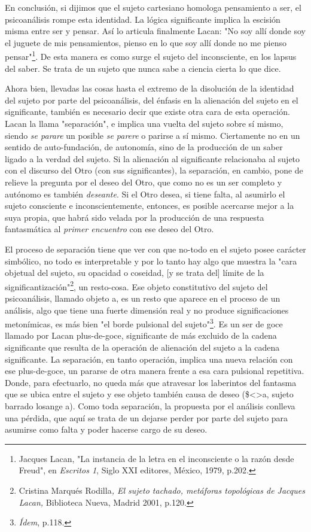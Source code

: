 \documentclass{book}
\begin{document}
En conclusión, si dijimos que el sujeto cartesiano homologa pensamiento
a ser, el psicoanálisis rompe esta identidad. La lógica significante
implica la escisión misma entre ser y pensar. Así lo articula finalmente
Lacan: "No soy allí donde soy el juguete de mis pensamientos, pienso en
lo que soy allí donde no me pienso pensar"\footnote{Jacques Lacan, "La
  instancia de la letra en el inconsciente o la razón desde Freud", en
  \emph{Escritos 1}, Siglo XXI editores, México, 1979, p.202.}. De esta
manera es como surge el sujeto del inconsciente, en los lapsus del
saber. Se trata de un sujeto que nunca sabe a ciencia cierta lo que
dice.

Ahora bien, llevadas las cosas hasta el extremo de la disolución de la
identidad del sujeto por parte del psicoanálisis, del énfasis en la
alienación del sujeto en el significante, también es necesario decir que
existe otra cara de esta operación. Lacan la llama "separación", e
implica una vuelta del sujeto sobre sí mismo, siendo \emph{se parare} un
posible \emph{se parere} o parirse a sí mismo. Ciertamente no en un
sentido de auto-fundación, de autonomía, sino de la producción de un
saber ligado a la verdad del sujeto. Si la alienación al significante
relacionaba al sujeto con el discurso del Otro (con sus significantes),
la separación, en cambio, pone de relieve la pregunta por el deseo del
Otro, que como no es un ser completo y autónomo es también
\emph{deseante}. Si el Otro desea, si tiene falta, al asumirlo el sujeto
consciente e inconscientemente, entonces, es posible acercarse mejor a
la suya propia, que habrá sido velada por la producción de una respuesta
fantasmática al \emph{primer encuentro} con ese deseo del Otro.

El proceso de separación tiene que ver con que no-todo en el sujeto
posee carácter simbólico, no todo es interpretable y por lo tanto hay
algo que muestra la "cara objetual del sujeto, su opacidad o coseidad,
{[}y se trata del{]} límite de la significantización"\footnote{Cristina
  Marqués Rodilla\emph{, El sujeto tachado, metáforas topológicas de
  Jacques Lacan,} Biblioteca Nueva, Madrid 2001, p.120.}, un resto-cosa.
Ese objeto constitutivo del sujeto del psicoanálisis, llamado objeto a,
es un resto que aparece en el proceso de un análisis, algo que tiene una
fuerte dimensión real y no produce significaciones metonímicas, es más
bien "el borde pulsional del sujeto"\footnote{\emph{Ídem}, p.118.}. Es
un ser de goce llamado por Lacan plus-de-goce, significante de más
excluido de la cadena significante que resulta de la operación de
alienación del sujeto a la cadena significante. La separación, en tanto
operación, implica una nueva relación con ese plus-de-goce, un pararse
de otra manera frente a esa cara pulsional repetitiva. Donde, para
efectuarlo, no queda más que atravesar los laberintos del fantasma que
se ubica entre el sujeto y ese objeto también causa de deseo
(\$\textless\textgreater a, sujeto barrado losange a). Como toda
separación, la propuesta por el análisis conlleva una pérdida, que aquí
se trata de un dejarse perder por parte del sujeto para asumirse como
falta y poder hacerse cargo de su deseo.
\end{document}
